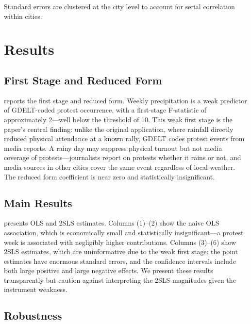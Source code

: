 \documentclass[12pt]{article}
\begin{document}
Standard errors are clustered at the city level to account for serial correlation within cities.


\section{Results}
\label{sec:results}

\subsection{First Stage and Reduced Form}

 reports the first stage and reduced form. Weekly precipitation is a weak predictor of GDELT-coded protest occurrence, with a first-stage F-statistic of approximately 2---well below the \citet{stock2005} threshold of 10. This weak first stage is the paper's central finding: unlike the original \citet{madestam2013} application, where rainfall directly reduced physical attendance at a known rally, GDELT codes protest events from media reports. A rainy day may suppress physical turnout but not media coverage of protests---journalists report on protests whether it rains or not, and media sources in other cities cover the same event regardless of local weather. The reduced form coefficient is near zero and statistically insignificant.



\subsection{Main Results}

 presents OLS and 2SLS estimates. Columns (1)--(2) show the naive OLS association, which is economically small and statistically insignificant---a protest week is associated with negligibly higher contributions. Columns (3)--(6) show 2SLS estimates, which are uninformative due to the weak first stage: the point estimates have enormous standard errors, and the confidence intervals include both large positive and large negative effects. We present these results transparently but caution against interpreting the 2SLS magnitudes given the instrument weakness.



\subsection{Robustness}
\end{document}
